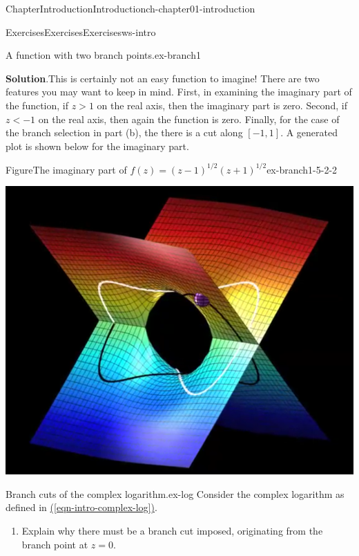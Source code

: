 \documentclass[oneside,10pt,]{book}
\newcommand{\blocktitlefont}{\relax}
\newcommand{\xreffont}{\relax}
\numberwithin{equation}{section}
\begin{document}
\begin{chapterptx}{Chapter}{Introduction}{}{Introduction}{}{}{ch-chapter01-introduction}
\begin{exercises-section}{Exercises}{Exercises}{}{Exercises}{}{}{ws-intro}
\begin{divisionexercise}{2}{A function with two branch points.}{}{ex-branch1}
\begin{enumerate}[font=\bfseries,label=(\alph*),ref=\alph*]
\noindent\textbf{\blocktitlefont Solution}.\hypertarget{ex-branch1-5-2}{}\quad{}This is certainly not an easy function to imagine! There are two features you may want to keep in mind. First, in examining the imaginary part of the function, if \(z > 1\) on the real axis, then the imaginary part is zero. Second, if \(z < -1\) on the real axis, then again the function is zero. Finally, for the case of the branch selection in part (b), the there is a cut along \([-1, 1]\). A generated plot is shown below for the imaginary part.%
\begin{figureptx}{Figure}{The imaginary part of \(f(z) = (z-1)^{1/2}(z +1)^{1/2}\)}{ex-branch1-5-2-2}{}%
\begin{image}{0.15}{0.7}{0.15}{}%
\includegraphics[width=\linewidth]{external/intro_doublesqrt_surf.png}
\end{image}%
\tcblower
\end{figureptx}%
\end{enumerate}%
\end{divisionexercise}%
\begin{divisionexercise}{3}{Branch cuts of the complex logarithm.}{}{ex-log}%
Consider the complex logarithm as defined in \hyperref[eqn-intro-complex-log]{({\xreffont\ref{eqn-intro-complex-log}})}.%
\begin{enumerate}[font=\bfseries,label=(\alph*),ref=\alph*]%
\item{}Explain why there must be a branch cut imposed, originating from the branch point at \(z = 0\).%
\par\smallskip%

\end{enumerate}
\end{divisionexercise}
\end{exercises-section}
\end{chapterptx}
\end{document}
